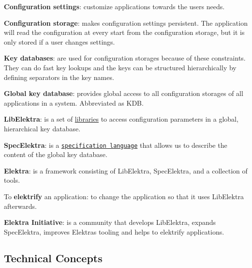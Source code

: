 
\begin{DoxyItemize}
\item {\bfseries Configuration settings}\+: customize applications towards the users needs.
\item {\bfseries Configuration storage}\+: makes configuration settings persistent. The application will read the configuration at every start from the configuration storage, but it is only stored if a user changes settings.
\item {\bfseries Key databases}\+: are used for configuration storages because of these constraints. They can do fast key lookups and the keys can be structured hierarchically by defining separators in the key names.
\item {\bfseries Global key database}\+: provides global access to all configuration storages of all applications in a system. Abbreviated as {\ttfamily K\+DB}.
\item {\bfseries Lib\+Elektra}\+: is a set of \hyperlink{md_src_libs_README_src_libs_README_md}{libraries} to access configuration parameters in a global, hierarchical key database.
\item {\bfseries Spec\+Elektra}\+: is a \href{/home/markus/Projekte/Elektra/current/doc/METADATA.ini}{\tt specification language} that allows us to describe the content of the global key database.
\item {\bfseries Elektra}\+: is a framework consisting of Lib\+Elektra, Spec\+Elektra, and a collection of tools.
\item To {\bfseries elektrify} an application\+: to change the application so that it uses Lib\+Elektra afterwards.
\item {\bfseries Elektra Initiative}\+: is a community that develops Lib\+Elektra, expands Spec\+Elektra, improves Elektra\textquotesingle{}s tooling and helps to elektrify applications.
\end{DoxyItemize}

\subsection*{Technical Concepts}


